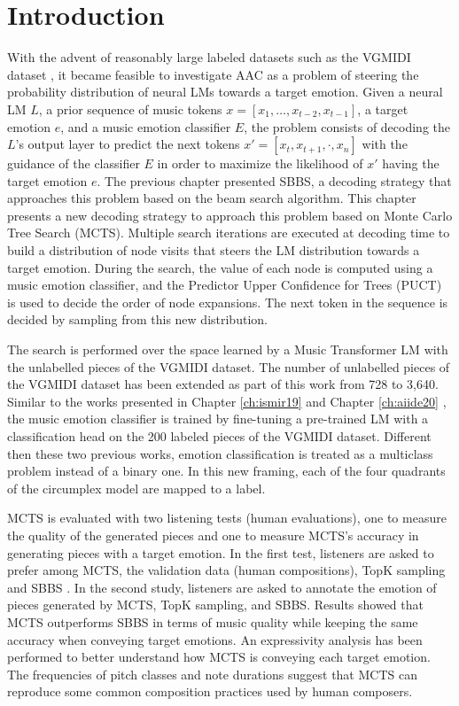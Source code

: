 \section{Introduction}

With the advent of reasonably large labeled datasets such as the VGMIDI dataset \cite{ferreira_2019}, it became feasible to investigate AAC \cite{williams2015investigating} as a problem of steering the probability distribution of neural LMs towards a target emotion. Given a neural LM $L$, a prior sequence of music tokens $x = [x_1, \dots, x_{t-2}, x_{t-1}]$, a target emotion $e$, and a music emotion classifier $E$, the problem consists of decoding the $L$'s output layer to predict the next tokens $x' = [x_t, x_{t+1}, \cdot, x_n]$ with the guidance of the classifier $E$ in order to maximize the likelihood of $x'$ having the target emotion $e$. The previous chapter presented SBBS, a decoding strategy that approaches this problem based on the beam search algorithm. This chapter presents a new decoding strategy to approach this problem based on Monte Carlo Tree Search (MCTS). Multiple search iterations are executed at decoding time to build a distribution of node visits that steers the LM distribution towards a target emotion. During the search, the value of each node is computed using a music emotion classifier, and the Predictor Upper Confidence for Trees (PUCT) is used to decide the order of node expansions. The next token in the sequence is decided by sampling from this new distribution.

The search is performed over the space learned by a Music Transformer LM \cite {huang2018music} with the unlabelled pieces of the VGMIDI dataset. The number of unlabelled pieces of the VGMIDI dataset has been extended as part of this work from 728 to 3,640. Similar to the works presented in Chapter \ref{ch:ismir19} \cite{ferreira_2019} and Chapter \ref{ch:aiide20} \cite{ferreira2020computer}, the music emotion classifier is trained by fine-tuning a pre-trained LM with a classification head on the 200 labeled pieces of the VGMIDI dataset. Different then these two previous works, emotion classification is treated as a multiclass problem instead of a binary one. In this new framing, each of the four quadrants of the circumplex model are mapped to a label.

MCTS is evaluated with two listening tests (human evaluations), one to measure the quality of the generated pieces and one to measure MCTS's accuracy in generating pieces with a target emotion. In the first test, listeners are asked to prefer among MCTS, the validation data (human compositions), TopK sampling and SBBS \cite{ferreira2020computer}. In the second study, listeners are asked to annotate the emotion of pieces generated by MCTS, TopK sampling, and SBBS. Results showed that MCTS outperforms SBBS in terms of music quality while keeping the same accuracy when conveying target emotions. An expressivity analysis \cite{smith2010analyzing} has been performed to better understand how MCTS is conveying each target emotion. The frequencies of pitch classes and note durations suggest that MCTS can reproduce some common composition practices used by human composers.

